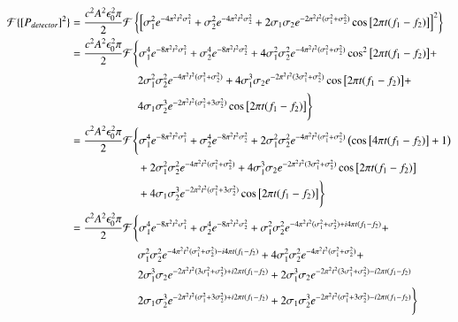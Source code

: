 \begin{align}
\mathcal{F}\{\left[P_{detector}\right]^2\} &= \frac{c^2A^2\epsilon_0^2 \pi}{2}\mathcal{F}\left\{\left[\sigma_1^2 e^{-4\pi^2t^2\sigma_1^2} + \sigma_2^2 e^{-4\pi^2t^2\sigma_2^2} + 2\sigma_1\sigma_2 e^{-2\pi^2t^2(\sigma_1^2+\sigma_2^2)}\cos\big[2\pi t (f_1-f_2)\big] \right]^2\right\}\notag\\
&= \frac{c^2A^2\epsilon_0^2 \pi}{2}\mathcal{F}\Bigg\{\sigma_1^4 e^{-8\pi^2t^2\sigma_1^2} + \sigma_2^4 e^{-8\pi^2t^2\sigma_2^2} + 4\sigma_1^2\sigma_2^2 e^{-4\pi^2t^2(\sigma_1^2+\sigma_2^2)}\cos^2\big[2\pi t (f_1-f_2)\big] + \notag\\
& \quad\quad\quad\quad\quad\quad 2\sigma_1^2\sigma_2^2 e^{-4\pi^2t^2(\sigma_1^2+\sigma_2^2)} + 4\sigma_1^3\sigma_2 e^{-2\pi^2t^2(3\sigma_1^2+\sigma_2^2)}\cos\big[2\pi t (f_1-f_2)\big] + \notag\\
& \quad\quad\quad\quad\quad\quad 4\sigma_1\sigma_2^3e^{-2\pi^2t^2(\sigma_1^2+3\sigma_2^2)}\cos\big[2\pi t (f_1-f_2)\big] \Bigg\}\notag\\
&= \frac{c^2A^2\epsilon_0^2 \pi}{2}\mathcal{F}\Bigg\{\sigma_1^4 e^{-8\pi^2t^2\sigma_1^2} + \sigma_2^4 e^{-8\pi^2t^2\sigma_2^2} + 2\sigma_1^2\sigma_2^2 e^{-4\pi^2t^2(\sigma_1^2+\sigma_2^2)}\left(\cos\big[4\pi t (f_1-f_2)\big]+1\right)\notag\\
&\quad\quad\quad\quad\quad\quad + 2\sigma_1^2\sigma_2^2 e^{-4\pi^2t^2(\sigma_1^2+\sigma_2^2)} + 4\sigma_1^3\sigma_2 e^{-2\pi^2t^2(3\sigma_1^2+\sigma_2^2)}\cos\big[2\pi t (f_1-f_2)\big] \notag\\
&\quad\quad\quad\quad\quad\quad + 4\sigma_1\sigma_2^3e^{-2\pi^2t^2(\sigma_1^2+3\sigma_2^2)}\cos\big[2\pi t (f_1-f_2)\big] \Bigg\}\notag\\
&= \frac{c^2A^2\epsilon_0^2 \pi}{2}\mathcal{F}\Bigg\{\sigma_1^4 e^{-8\pi^2t^2\sigma_1^2} + \sigma_2^4 e^{-8\pi^2t^2\sigma_2^2} + \sigma_1^2\sigma_2^2 e^{-4\pi^2t^2(\sigma_1^2+\sigma_2^2)+i4\pi t (f_1-f_2)} +\notag\\
&\quad\quad\quad\quad\quad\quad \sigma_1^2\sigma_2^2 e^{-4\pi^2t^2(\sigma_1^2+\sigma_2^2)-i4\pi t (f_1-f_2)} + 4\sigma_1^2\sigma_2^2 e^{-4\pi^2t^2(\sigma_1^2+\sigma_2^2)} +\notag\\
&\quad\quad\quad\quad\quad\quad  2\sigma_1^3\sigma_2 e^{-2\pi^2t^2(3\sigma_1^2+\sigma_2^2)+i2\pi t (f_1-f_2)} + 2\sigma_1^3\sigma_2 e^{-2\pi^2t^2(3\sigma_1^2+\sigma_2^2)-i2\pi t (f_1-f_2)}\notag\\
&\quad\quad\quad\quad\quad\quad 2\sigma_1\sigma_2^3e^{-2\pi^2t^2(\sigma_1^2+3\sigma_2^2)+i2\pi t (f_1-f_2)} + 2\sigma_1\sigma_2^3e^{-2\pi^2t^2(\sigma_1^2+3\sigma_2^2)-i2\pi t (f_1-f_2)}\Bigg\}\notag\\

\end{align}
